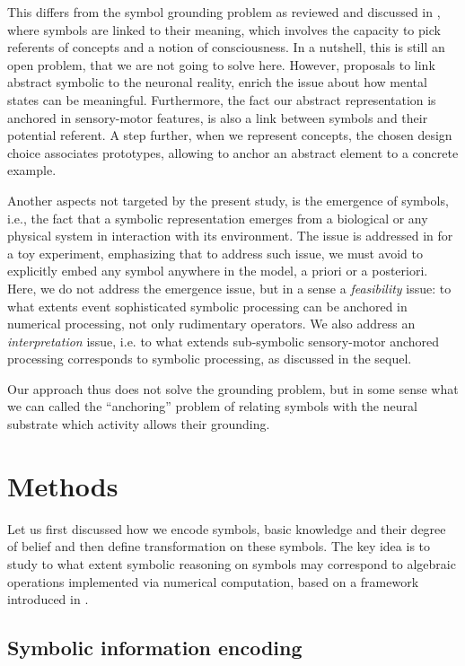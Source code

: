 \documentclass[a4]{article}
\begin{document}
This differs from the symbol grounding problem as reviewed and discussed in \cite{taddeo_solving_2005}, where symbols are linked to their meaning, which involves the capacity to pick referents of concepts and a notion of consciousness. In a nutshell, this is still an open problem, that we are not going to solve here. However, proposals to link abstract symbolic to the neuronal reality, enrich the issue about how mental states can be meaningful. Furthermore, the fact our abstract representation is anchored in sensory-motor features, is also a link between symbols and their potential referent. A step further, when we represent concepts, the chosen design choice associates prototypes, allowing to anchor an abstract element to a concrete example.

Another aspects not targeted by the present study, is the emergence of symbols, i.e., the fact that a symbolic representation emerges from a biological or any physical system in interaction with its environment. The issue is addressed in \cite{rougier_implicit_2009} for a toy experiment, emphasizing that to address such issue, we must avoid to explicitly embed any symbol anywhere in the model, a priori or a posteriori. Here, we do not address the emergence issue, but in a sense a {\em feasibility} issue: to what extents event sophisticated symbolic processing can be anchored in numerical processing, not only rudimentary operators. We also address an {\em interpretation} issue, i.e. to what extends sub-symbolic sensory-motor anchored processing corresponds to symbolic processing, as discussed in the sequel.

Our approach thus does not solve the grounding problem, but in some sense what we can called the ``anchoring'' problem of relating symbols with the neural substrate which activity allows their grounding.

\fi

\section{Methods}

Let us first discussed how we encode symbols, basic knowledge and their degree of belief and then define transformation on these symbols. The key idea is to study to what extent symbolic reasoning on symbols may correspond to algebraic operations implemented via numerical computation, based on a framework introduced in \cite{eliasmith_how_2013}.

\subsection{Symbolic information encoding}
\end{document}
